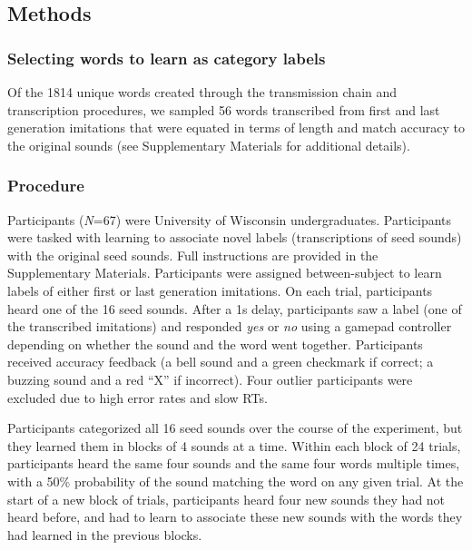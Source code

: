 \documentclass[english,floatsintext,man]{apa6}
\theoremstyle{definition}
\theoremstyle{definition}
\theoremstyle{definition}
\theoremstyle{remark}
\begin{document}
\hypertarget{methods-2}{%
\subsection{Methods}\label{methods-2}}

\hypertarget{selecting-words-to-learn-as-category-labels}{%
\subsubsection{Selecting words to learn as category
labels}\label{selecting-words-to-learn-as-category-labels}}

Of the 1814 unique words created through the transmission chain and
transcription procedures, we sampled 56 words transcribed from first and
last generation imitations that were equated in terms of length and
match accuracy to the original sounds (see Supplementary Materials for
additional details).

\hypertarget{procedure}{%
\subsubsection{Procedure}\label{procedure}}

Participants (\emph{N}=67) were University of Wisconsin undergraduates.
Participants were tasked with learning to associate novel labels
(transcriptions of seed sounds) with the original seed sounds. Full
instructions are provided in the Supplementary Materials. Participants
were assigned between-subject to learn labels of either first or last
generation imitations. On each trial, participants heard one of the 16
seed sounds. After a 1s delay, participants saw a label (one of the
transcribed imitations) and responded \emph{yes} or \emph{no} using a
gamepad controller depending on whether the sound and the word went
together. Participants received accuracy feedback (a bell sound and a
green checkmark if correct; a buzzing sound and a red \enquote{X} if
incorrect). Four outlier participants were excluded due to high error
rates and slow RTs.

Participants categorized all 16 seed sounds over the course of the
experiment, but they learned them in blocks of 4 sounds at a time.
Within each block of 24 trials, participants heard the same four sounds
and the same four words multiple times, with a 50\% probability of the
sound matching the word on any given trial. At the start of a new block
of trials, participants heard four new sounds they had not heard before,
and had to learn to associate these new sounds with the words they had
learned in the previous blocks.
\end{document}
